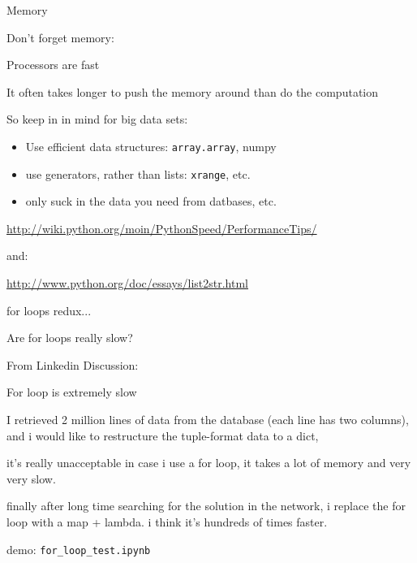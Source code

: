 \documentclass{beamer}
\begin{document}
\begin{frame}[fragile]{Memory}

\vfill
{\LARGE Don't forget memory:}

\vfill
{\Large Processors are fast}

\vfill
{\Large It often takes longer to push the memory around than do the computation}

\vfill
{\Large So keep in in mind for big data sets:}
\begin{itemize}
   \item Use efficient data structures: \verb|array.array|, numpy
   \item use generators, rather than lists: \verb|xrange|, etc.
   \item only suck in the data you need from datbases, etc.  
\end{itemize}


\vfill
\url{http://wiki.python.org/moin/PythonSpeed/PerformanceTips/}

and:

\url{http://www.python.org/doc/essays/list2str.html}

\end{frame} 

\begin{frame}[fragile]{for loops redux...}

{\LARGE Are for loops really slow?}

\vfill
{\Large From Linkedin Discussion:}

\vfill
{\large For loop is extremely slow}

I retrieved 2 million lines of data from the database (each line has two columns), and i would like to restructure the tuple-format data to a dict,

it's really unacceptable in case i use a for loop, it takes a lot of memory and very very slow.

finally after long time searching for the solution in the network, i replace the for loop with a map + lambda. i think it's hundreds of times faster.


\vfill
demo: \verb|for_loop_test.ipynb|

\end{frame} 
\end{document}
